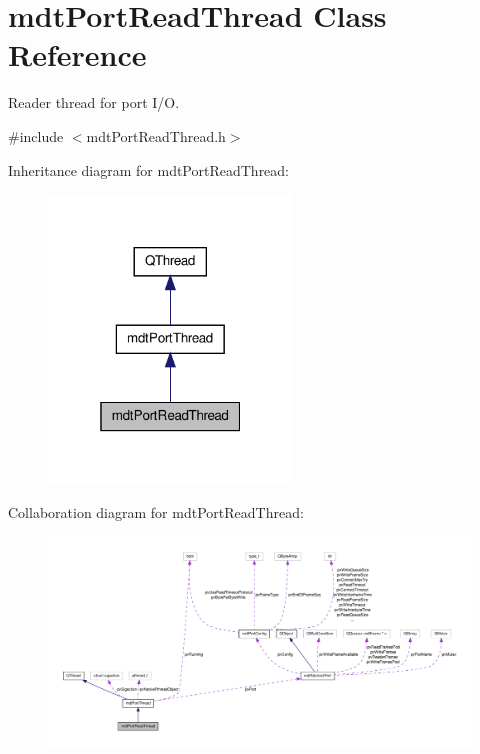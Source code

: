 \hypertarget{classmdt_port_read_thread}{\section{mdt\-Port\-Read\-Thread Class Reference}
\label{classmdt_port_read_thread}
}


Reader thread for port I/\-O.  




{\ttfamily \#include $<$mdt\-Port\-Read\-Thread.\-h$>$}



Inheritance diagram for mdt\-Port\-Read\-Thread\-:
\nopagebreak
\begin{figure}[H]
\begin{center}
\leavevmode
\includegraphics[width=184pt]{classmdt_port_read_thread__inherit__graph}
\end{center}
\end{figure}


Collaboration diagram for mdt\-Port\-Read\-Thread\-:
\nopagebreak
\begin{figure}[H]
\begin{center}
\leavevmode
\includegraphics[width=350pt]{classmdt_port_read_thread__coll__graph}
\end{center}
\end{figure}

